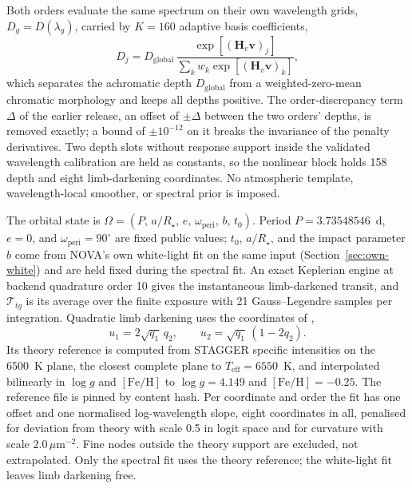 Both orders evaluate the same spectrum on their own wavelength grids,
$D_g=D(\lambda_g)$, carried by $K=160$ adaptive basis coefficients,
\begin{equation}
  D_j = D_{\mathrm{global}}\,
  \frac{\exp\!\left[(\bm{H}_v\bm{v})_j\right]}
       {\sum_k w_k \exp\!\left[(\bm{H}_v\bm{v})_k\right]} ,
  \label{eq:depth-basis}
\end{equation}
which separates the achromatic depth $D_{\mathrm{global}}$ from a
weighted-zero-mean chromatic morphology and keeps all depths positive.
The order-discrepancy term $\Delta$ of the earlier release, an offset of
$\pm\Delta$ between the two orders' depths, is removed exactly; a bound
of $\pm10^{-12}$ on it breaks the invariance of the penalty derivatives.
Two depth slots without response support inside the validated wavelength
calibration are held as constants, so the nonlinear block holds 158
depth and eight limb-darkening coordinates. No atmospheric template,
wavelength-local smoother, or spectral prior is imposed.

The orbital state is
$\Omega=(P,\,a/R_\star,\,e,\,\omega_{\mathrm{peri}},\,b,\,t_0)$. Period
$P=3.73548546$~d, $e=0$, and $\omega_{\mathrm{peri}}=90^\circ$ are fixed
public values; $t_0$, $a/R_\star$, and the impact parameter $b$ come
from NOVA's own white-light fit on the same input
(Section~\ref{sec:own-white}) and are held fixed during the spectral fit.
An exact Keplerian engine \citep{Jaxoplanet2025} at backend quadrature
order 10 gives the instantaneous limb-darkened transit, and
$\mathcal{T}_{tg}$ is its average over the finite exposure with 21
Gauss--Legendre samples per integration. Quadratic limb darkening
\citep{MandelAgol2002} uses the coordinates of \citet{Kipping2013},
\begin{equation}
 u_1=2\sqrt{q_1}\,q_2, \qquad
 u_2=\sqrt{q_1}\,(1-2q_2).
 \label{eq:kipping-coordinates}
\end{equation}
Its theory reference is computed from STAGGER specific intensities
\citep{MagicEtAl2015} on the 6500~K plane, the closest complete plane to
$T_{\mathrm{eff}}=6550$~K, and interpolated bilinearly in $\log g$ and
$[\mathrm{Fe}/\mathrm{H}]$ to $\log g=4.149$ and
$[\mathrm{Fe}/\mathrm{H}]=-0.25$. The reference file is pinned by
content hash. Per coordinate and
order the fit has one offset and one normalised log-wavelength slope,
eight coordinates in all, penalised for deviation from theory with scale
0.5 in logit space and for curvature with scale
$2.0\,\mu\mathrm{m}^{-2}$. Fine nodes outside the theory support are
excluded, not extrapolated. Only the spectral fit uses the theory
reference; the white-light fit leaves limb darkening free.

